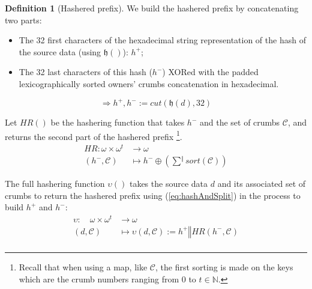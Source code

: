 \documentclass[twoside,twocolumn]{article}
\theoremstyle{definition}
\newtheorem{definition}{Definition}
\theoremstyle{remark}
\begin{document}
\begin{definition}[Hashered prefix]
    \label{hashered}
    We build the hashered prefix by concatenating two parts:
    \begin{itemize}
        \item The 32 first characters of the hexadecimal string representation of the hash of the source data (using $\mathfrak{h}()$): $h^+$;
        \item The 32 last characters of this hash ($h^-$) XORed with the padded lexicographically sorted owners' crumbs concatenation in hexadecimal.
    \end{itemize}
    \begin{equation}
        \label{eq:hashAndSplit}
        \Rightarrow h^+, h^- := cut \left( \mathfrak{h}(d), 32 \right)
    \end{equation}

    \vspace{1em} %

    Let $HR()$ be the hashering function that takes $h^-$ and the set of crumbs $\mathcal{C}$, and returns the second part of the hashered prefix
    \footnote{Recall that when using a map, like $\mathcal{C}$, the first sorting is made on the keys which are the crumb numbers ranging from $0$ 
    to $t \in \mathbb{N}$.}.
    \begin{equation}
        \label{eq:hashering}
        \begin{array}{rl}
            HR: \omega \times \omega^t &\to \omega \\
                (h^-, \mathcal{C}) &\mapsto h^- \oplus \left( \sum^{\mathbin\Vert} sort(\mathcal{C}) \right)
        \end{array} 
    \end{equation}

    The full hashering function $\upsilon()$ takes the source data $d$ and its associated set of crumbs to return the hashered prefix using 
    (\ref{eq:hashAndSplit}) in the process to build $h^+$ and $h^-$:
    \begin{equation}
        \label{eq:hashered}
        \begin{array}{rl}
            \upsilon: \quad \omega \times \omega^t &\to \omega \\
                (d, \mathcal{C}) &\mapsto \upsilon(d, \mathcal{C}) := h^+ \mathbin\Vert HR(h^-, \mathcal{C}) \\
        \end{array}
    \end{equation}


\end{definition}
\end{document}
